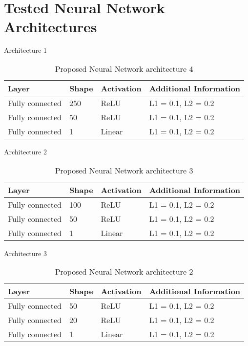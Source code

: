 \section{Tested Neural Network Architectures}
\label{sec:appendices}

Architecture 1

\begin{table}[!htb]
\centering
\begin{tabular}{l l l l}
	\hline
	Layer & Shape & Activation & Additional Information\\
  	\hline
  	Fully connected & 250 & ReLU & L1 = 0.1, L2 = 0.2\\
  	Fully connected & 50 & ReLU & L1 = 0.1, L2 = 0.2\\
  	Fully connected & 1 & Linear & L1 = 0.1, L2 = 0.2\\
  	\hline
\end{tabular}
\caption{Proposed Neural Network architecture 4}
\label{table:proposed_nn_4}
\end{table}

Architecture 2

\begin{table}[!htb]
\centering
\begin{tabular}{l l l l}
	\hline
	Layer & Shape & Activation & Additional Information\\
  	\hline
  	Fully connected & 100 & ReLU & L1 = 0.1, L2 = 0.2\\
  	Fully connected & 50 & ReLU & L1 = 0.1, L2 = 0.2\\
  	Fully connected & 1 & Linear & L1 = 0.1, L2 = 0.2\\
  	\hline
\end{tabular}
\caption{Proposed Neural Network architecture 3}
\label{table:proposed_nn_3}
\end{table}

Architecture 3

\begin{table}[!htb]
\centering
\begin{tabular}{l l l l}
	\hline
	Layer & Shape & Activation & Additional Information\\
  	\hline
  	Fully connected & 50 & ReLU & L1 = 0.1, L2 = 0.2\\
  	Fully connected & 20 & ReLU & L1 = 0.1, L2 = 0.2\\
  	Fully connected & 1 & Linear & L1 = 0.1, L2 = 0.2\\
  	\hline
\end{tabular}
\caption{Proposed Neural Network architecture 2}
\label{table:proposed_nn_2}
\end{table}

